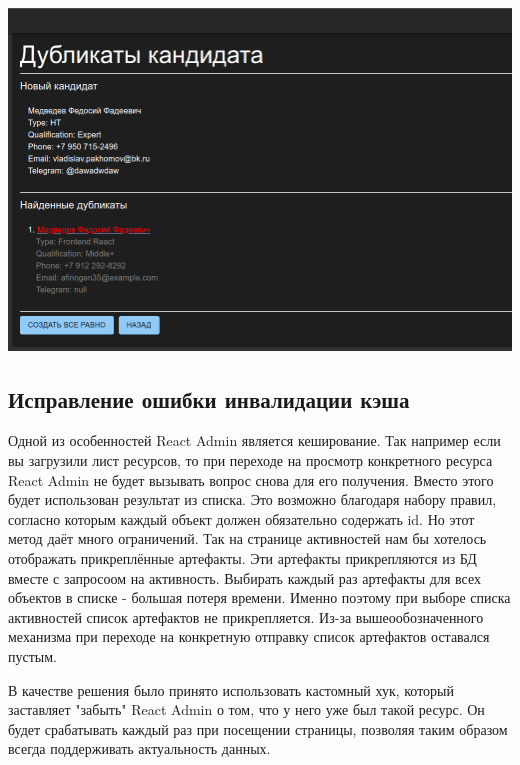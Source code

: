 \documentclass[a4paper,14pt]{extarticle}
\begin{document}
\includegraphics[width=140mm]{can}

\subsection{Исправление ошибки инвалидации кэша}

Одной из особенностей React Admin является кеширование. Так например если вы загрузили лист ресурсов, 
то при переходе на просмотр конкретного ресурса React Admin не будет вызывать вопрос снова для его получения. 
Вместо этого будет использован результат из списка. Это возможно благодаря набору правил, согласно которым 
каждый объект должен обязательно содержать id. Но этот метод даёт много ограничений. Так на странице активностей
нам бы хотелось отображать прикреплённые артефакты. Эти артефакты прикрепляются из БД вместе с запросоом на 
активность. Выбирать каждый раз артефакты для всех объектов в списке - большая потеря времени. Именно поэтому
при выборе списка активностей список артефактов не прикрепляется. Из-за вышеообозначенного механизма при переходе
на конкретную отправку список артефактов оставался пустым. 

В качестве решения было принято использовать кастомный хук, который заставляет "забыть" React Admin о том, что 
у него уже был такой ресурс. Он будет срабатывать каждый раз при посещении страницы, позволяя таким образом 
всегда поддерживать актуальность данных. 
\end{document}
